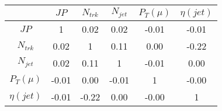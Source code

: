 \begin{tabular}{|c|c|c|c|c|c|} 
\hline
 & $JP$ & $N_{trk}$ & $N_{jet}$ & $P_{T} (\mu)$ & $\eta (jet)$ \\ \hline
$JP$ & 1 & 0.02 & 0.02 & -0.01 & -0.01 \\
$N_{trk}$ & 0.02 & 1 & 0.11 & 0.00 & -0.22 \\
$N_{jet}$ & 0.02 & 0.11 & 1 & -0.01 & 0.00 \\
$P_{T} (\mu)$ & -0.01 & 0.00 & -0.01 & 1 & -0.00 \\
$\eta (jet)$ & -0.01 & -0.22 & 0.00 & -0.00 & 1 \\
\hline 
\end{tabular} 


